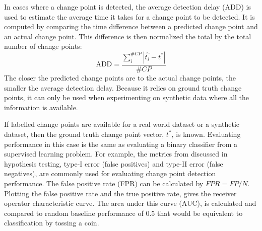 



In cases where a change point is detected, the average detection delay (ADD) is used to estimate the average time it takes for a change point to be detected. It is computed by comparing the time difference between a predicted change point and an actual change point. This difference is then normalized the total by the total number of change points:
\begin{equation}
\text{ADD} = \frac{\sum_i^{\#CP} |\hat{t_i} - t^*|}{\#CP}
\end{equation}
The closer the predicted change points are to the actual change points, the smaller the average detection delay. Because it relies on ground truth change points, it can only be used when experimenting on synthetic data where all the information is available.%

If labelled change points are available for a real world dataset or a synthetic dataset, then the ground truth change point vector, 
$t^*$, is known. Evaluating performance in this case is the same as evaluating a binary classifier from a supervised learning problem. For example, the metrics from discussed in hypothesis testing, type-I error (false positives) and type-II error (false negatives), are commonly used for evaluating change point detection performance. The false positive rate (FPR) can be calculated by $FPR = FP / N$. Plotting the false positive rate and the true positive rate, gives the receiver operator characteristic curve. The area under this curve (AUC), is calculated and compared to random baseline performance of 0.5 that would be equivalent to classification by tossing a coin.

